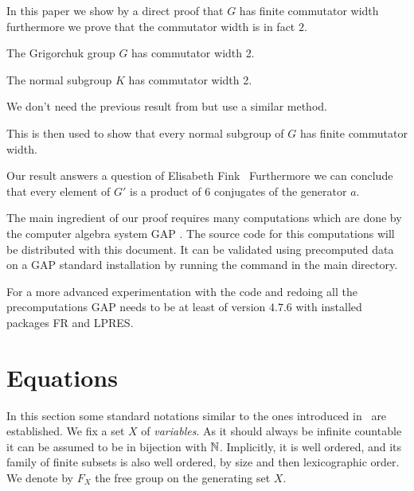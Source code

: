 \documentclass[a4paper,11pt]{amsart}
\begin{document}
In this paper we show by a direct proof that $G$ has finite commutator width 
furthermore we prove that the commutator width is in fact $2$.
\begin{thm}\label{thm:CWGrigorchukGroup}
 The Grigorchuk group $G$ has commutator width 2.
 
 The normal subgroup $K$ has commutator width 2.
\end{thm}
We don't need the previous result from \cite{Lysenok:QudraticEquationsInGrig}
but use a similar method.

This is then used to show that every normal subgroup of $G$ has
finite commutator width.

Our result answers a question of Elisabeth Fink~\cite[Question 3]{Fink:Conjugacy_growth}
Furthermore we can conclude that every element of $G'$ is a product of 
$6$ conjugates of the generator $a$.

The main ingredient of our proof requires many computations which are 
done by the computer algebra system GAP \cite{GAP4}. The source code
for this computations will be distributed with this document. It can
be validated using precomputed data on a GAP standard installation
by running the command  in the main directory.

For a more advanced experimentation with the code and redoing all 
the precomputations GAP needs to be at least of version $4.7.6$ 
with installed packages FR\cite{FR2.3.6} and 
LPRES\cite{LPRES0.3.0}.

\section{Equations}
In this section some standard notations similar to the ones introduced
in~\cite{ComerfordEquationsFreeGroups} are established. We fix a set
$X$ of \emph{variables}. As it should always be infinite countable it
can be assumed to be in bijection with $\mathbb{N}$. Implicitly, it is well
ordered, and its family of finite subsets is also well ordered, by
size and then lexicographic order. We denote by $F_X$ the free group
on the generating set $X$.
\end{document}
